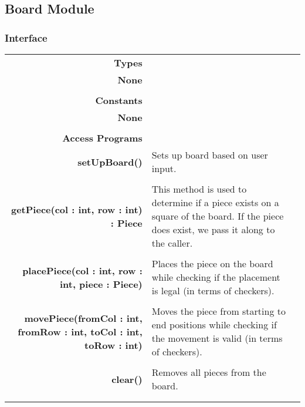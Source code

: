 \documentclass[10pt]{article}
\makeatletter
\newcommand{\CustomLabel}[1]{\Hy@raisedlink{\hypertarget{#1}{}}\label{#1}}
\makeatother
\begin{document}
        
        
        
        
    \subsection{Board Module}\CustomLabel{mis:Board}
    \subsubsection{Interface}
        \begin{tabularx}{\linewidth}{@{} >{\bfseries}r Xp{5cm} }
            Types           & \begin{tabular}[t]{@{} l p{8cm}} 
                                     & \\
                                    None & \\
                              \end{tabular} \\
                              
            Constants       & \begin{tabular}[t]{@{} l p{8cm}} 
                                     & \\
                                    None & \\
                              \end{tabular} \\

            Access Programs & \begin{tabular}[t]{@{} p{4cm} p{8cm}}
                                     & \\
                                    setUpBoard() & Sets up board based on user input. \\
                                     & \\
                                    getPiece(col : int, row : int) : Piece & This method is used to determine if a piece exists on a square of the board. If the piece does exist, we pass it along to the caller. \\ 
                                     & \\
                                    placePiece(col : int, row : int, piece : Piece) & Places the piece on the board while checking if the placement is legal (in terms of checkers). \\
                                     & \\
                                    movePiece(fromCol : int, fromRow : int, toCol : int, toRow : int) & Moves the piece from starting to end positions while checking if the movement is valid (in terms of checkers). \\
                                     & \\
                                    clear() & Removes all pieces from the board. \\
                                     & \\
                             \end{tabular}
        \end{tabularx}
        
\end{document}
